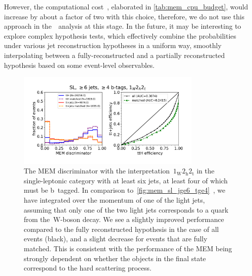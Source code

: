 However, the computational cost~, elaborated in \cref{tab:mem_cpu_budget}, would increase by about a factor of two with this choice, therefore, we do not use this approach in the~\ttHbb~analysis at this stage. In the future, it may be interesting to explore complex hypothesis tests, which effectively combine the probabilities under various jet reconstruction hypotheses in a uniform way, smoothly interpolating between a fully-reconstructed and a partially reconstructed hypothesis based on some event-level observables.

\begin{figure}[ht]
\begin{centering}
\includegraphics[width = 0.8\textwidth]{figures/mem/mem_sl_jge6_tge4_1w2h2t.pdf}
\caption[MEM with the~$1_{\mathrm{W}} 2_{\mathrm{h}} 2_{\mathrm{t}}$ interpretation in the $\ge6$ jet, $\ge4$ b~tag category]{The MEM discriminator with the interpretation~$1_{\mathrm{W}} 2_{\mathrm{h}} 2_{\mathrm{t}}$ in the single-leptonic category with at least six jets, at least four of which must be b~tagged. In comparison to~\cref{fig:mem_sl_jge6_tge4}~, we have integrated over the momentum of one of the light jets, assuming that only one of the two light jets corresponds to a quark from the~$\mathrm{W}$-boson decay. We see a slightly improved performance compared to the fully reconstructed hypothesis in the case of all events (black), and a slight decrease for events that are fully matched. This is consistent with the performance of the MEM being strongly dependent on whether the objects in the final state correspond to the hard scattering process.}
\label{fig:mem_sl_jge6_tge4_1w2h2t}
\end{centering}
\end{figure}


